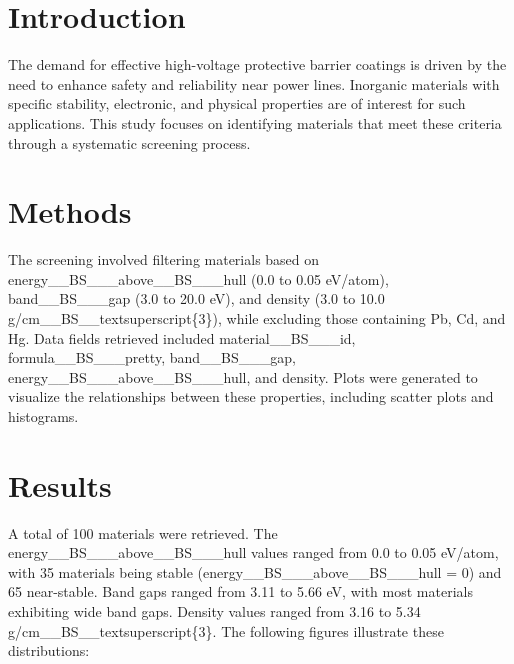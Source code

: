 \begin{abstract}
This study aims to identify stable inorganic materials that could serve as high-voltage protective barrier coatings near power lines. The screening process retrieved 100 materials, focusing on energy\_\_BS\_\_\_above\_\_BS\_\_\_hull between 0.0 and 0.05 eV/atom, band\_\_BS\_\_\_gap between 3.0 and 20.0 eV, and density between 3.0 and 10.0 g/cm\_\_BS\_\_textsuperscript\{3\}, while excluding toxic elements such as Pb, Cd, and Hg. The retrieved set was characterized based on these properties, and plots were generated to visualize the relationships and distributions of key parameters.
\end{abstract}

\section{Introduction}
The demand for effective high-voltage protective barrier coatings is driven by the need to enhance safety and reliability near power lines. Inorganic materials with specific stability, electronic, and physical properties are of interest for such applications. This study focuses on identifying materials that meet these criteria through a systematic screening process.

\section{Methods}
The screening involved filtering materials based on energy\_\_BS\_\_\_above\_\_BS\_\_\_hull (0.0 to 0.05 eV/atom), band\_\_BS\_\_\_gap (3.0 to 20.0 eV), and density (3.0 to 10.0 g/cm\_\_BS\_\_textsuperscript\{3\}), while excluding those containing Pb, Cd, and Hg. Data fields retrieved included material\_\_BS\_\_\_id, formula\_\_BS\_\_\_pretty, band\_\_BS\_\_\_gap, energy\_\_BS\_\_\_above\_\_BS\_\_\_hull, and density. Plots were generated to visualize the relationships between these properties, including scatter plots and histograms.

\section{Results}
A total of 100 materials were retrieved. The energy\_\_BS\_\_\_above\_\_BS\_\_\_hull values ranged from 0.0 to 0.05 eV/atom, with 35 materials being stable (energy\_\_BS\_\_\_above\_\_BS\_\_\_hull = 0) and 65 near-stable. Band gaps ranged from 3.11 to 5.66 eV, with most materials exhibiting wide band gaps. Density values ranged from 3.16 to 5.34 g/cm\_\_BS\_\_textsuperscript\{3\}. The following figures illustrate these distributions:

